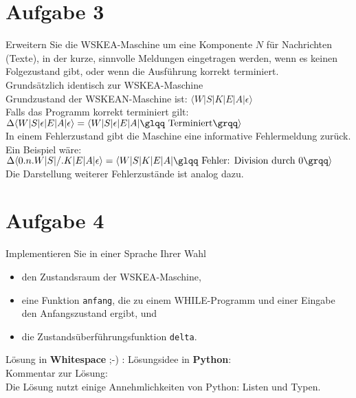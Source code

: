 \documentclass[ngerman,a4paper]{report}
\begin{document}
\section*{Aufgabe 3}
Erweitern Sie die WSKEA-Maschine um eine Komponente $N$ für Nachrichten (Texte), in der kurze, sinnvolle Meldungen eingetragen werden, wenn es keinen Folgezustand gibt, oder wenn die Ausführung korrekt terminiert.\\

Grundsätzlich identisch zur WSKEA-Maschine\\

Grundzustand der WSKEAN-Maschine ist: $\langle W|S|K|E|A|\epsilon\rangle$\\

Falls das Programm korrekt terminiert gilt: $\Delta\langle W|S|\epsilon|E|A|\epsilon\rangle = \langle W|S|\epsilon|E|A|\text{\glqq Terminiert\grqq} \rangle$\\

In einem Fehlerzustand gibt die Maschine eine informative Fehlermeldung zurück. Ein Beispiel wäre:\\

$\Delta\langle 0.n.W|S|/.K|E|A|\epsilon\rangle = \langle W|S|K|E|A|\text{\glqq Fehler: Division durch 0\grqq}\rangle$\\

Die Darstellung weiterer Fehlerzustände ist analog dazu.

\section*{Aufgabe 4 }
Implementieren Sie in einer Sprache Ihrer Wahl
\begin{itemize}
	\item den Zustandsraum der WSKEA-Maschine,
	\item eine Funktion \texttt{anfang}, die zu einem WHILE-Programm und einer Eingabe den Anfangszustand ergibt, und
	\item die Zustandsüberführungsfunktion \texttt{delta}.
\end{itemize}

Lösung in \textbf{Whitespace} ;-) :
\newpage
Lösungsidee in \textbf{Python}:\\

Kommentar zur Lösung:\\
Die Lösung nutzt einige Annehmlichkeiten von Python: Listen und Typen.
\end{document}
